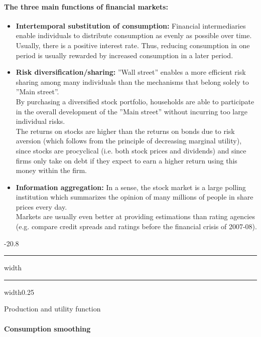 \documentclass[a4paper,landscape,7pt,fleqn]{scrartcl}
\makeatletter
\renewcommand{\emph}[1]{\textbf{#1}}
\renewcommand{\subsection}{\@startsection{subsection}{1}{0mm}%
{-2\baselineskip}{0.8\baselineskip}%
{\hrule depth 0.2pt width\columnwidth\hrule depth0.75pt
width0.25\columnwidth\vspace*{1.2em}\large\bfseries}}
\makeatother
\begin{document}
\begin{multicols*}{3}
\paragraph{The three main functions of financial markets:}

\begin{itemize}
\item \emph{Intertemporal substitution of consumption:} Financial intermediaries enable individuals to distribute consumption as evenly as possible over time. \\
Usually, there is a positive interest rate. Thus, reducing consumption in one period is usually rewarded by increased consumption in a later period.
\item \emph{Risk diversification/sharing:} ''Wall street'' enables a more efficient risk sharing among many individuals than the mechanisms that belong solely to ''Main street''. \\
By purchasing a diversified stock portfolio, households are able to participate in the overall development of the ''Main street'' without incurring too large individual risks. \\
The returns on stocks are higher than the returns on bonds due to risk aversion (which follows from the principle of decreasing marginal utility), since stocks are procyclical (i.e. both stock prices and dividends) and since firms only take on debt if they expect to earn a higher return using this money within the firm.
\item \emph{Information aggregation:} In a sense, the stock market is a large polling institution which summarizes the opinion of many millions of people in share prices every day. \\
Markets are usually even better at providing estimations than rating agencies (e.g. compare credit spreads and ratings before the financial crisis of 2007-08).
\end{itemize}

\subsection{Production and utility function}

\paragraph{Consumption smoothing}


\end{multicols*}
\end{document}
